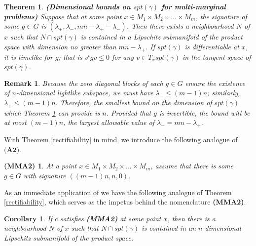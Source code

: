 \documentclass[letter,10pt]{article}
\theoremstyle{dotless}
\begin{document}
\newtheorem{spacelike}[rectifiability]{Theorem}
\begin{spacelike}\label{spacelike}\textbf{(Dimensional bounds on $spt(\gamma)$ for multi-marginal problems)}
Suppose that at some point $x \in M_1 \times M_2 \times...\times M_m$, the signature of some $g \in G$ is $(\lambda_+,\lambda_- , mn-\lambda_+-\lambda_-)$.  Then there exists a neighbourhood $N$ of $x$ such that $N \cap spt(\gamma)$ is contained in a Lipschitz submanifold of the product space with dimension no greater than  $mn-\lambda_+$.  If $spt(\gamma)$ is differentiable at $x$, it is \emph{timelike} for $g$; that is $v^tgv \leq 0$ for any $v \in T_x spt(\gamma)$ in the tangent space of $spt(\gamma)$.
\end{spacelike}

\newtheorem{bestsig}[rectifiability]{Remark}
\begin{bestsig}
Because the zero diagonal blocks of each $g \in G$ ensure the existence of $n$-dimensional lightlike subspace, we must have $\lambda_- \leq (m-1)n$; similarly, $\lambda_+ \leq (m-1)n$.  Therefore, the smallest bound on the dimension of $spt(\gamma)$ which Theorem \ref{spacelike} can provide is $n$.   Provided that $g$ is invertible, the bound will be at most $(m-1)n$, the largest allowable value of $\lambda_-=mn-\lambda_+$.
\end{bestsig}
With Theorem \ref{rectifiability} in mind, we introduce the following analogue of $\textbf{(A2)}$.
\newtheorem*{mmnondeg}{(MMA2)}
\begin{mmnondeg}
At a point $x \in M_1 \times M_2 \times...\times M_m$, assume that there is some $g \in G$ with signature $((m-1)n,n,0)$.
\end{mmnondeg}
As an immediate application of we have the following analogue of Theorem \ref{rectifiability}, which serves as the impetus behind the nomenclature \textbf{(MMA2)}.

\newtheorem{ndimsol}[rectifiability]{Corollary}

\begin{ndimsol}
If $c$ satisfies \textbf{(MMA2)} at some point $x$, then there is a neighbourhood $N$ of $x$ such that $N \cap spt(\gamma)$ is contained in an $n$-dimensional Lipschitz submanifold of the product space.
\end{ndimsol}
\end{document}
